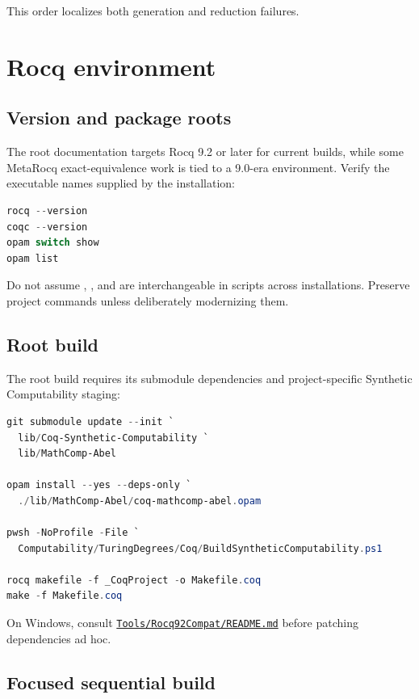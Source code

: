 \documentclass[
  10pt,
  a4paper,
  twoside,
  open=any,
  parskip=half,
  headings=big
]{scrreprt}
\newcommand{\CommitFull}{675d0a2ff0fc624fba199e006049016ba806f40a}
\newcommand{\RepoBlobBase}{https://github.com/VladimirReshetnikov/ProveIt/blob/\CommitFull/}
\newcommand{\RepoFile}[1]{%
  \href{\RepoBlobBase\detokenize{#1}}{\nolinkurl{#1}}}
\newcommand{\code}[1]{\texttt{\detokenize{#1}}}
\begin{document}
This order localizes both generation and reduction failures.

\section{Rocq environment}

\subsection{Version and package roots}

The root documentation targets Rocq 9.2 or later for current builds, while
some MetaRocq exact-equivalence work is tied to a 9.0-era environment.  Verify
the executable names supplied by the installation:

\begin{lstlisting}[language=PowerShell]
rocq --version
coqc --version
opam switch show
opam list
\end{lstlisting}

Do not assume \code{coqc}, \code{rocq c}, and \code{rocq compile} are
interchangeable in scripts across installations.  Preserve project commands
unless deliberately modernizing them.

\subsection{Root build}

The root build requires its submodule dependencies and project-specific
Synthetic Computability staging:

\begin{lstlisting}[language=PowerShell]
git submodule update --init `
  lib/Coq-Synthetic-Computability `
  lib/MathComp-Abel

opam install --yes --deps-only `
  ./lib/MathComp-Abel/coq-mathcomp-abel.opam

pwsh -NoProfile -File `
  Computability/TuringDegrees/Coq/BuildSyntheticComputability.ps1

rocq makefile -f _CoqProject -o Makefile.coq
make -f Makefile.coq
\end{lstlisting}

On Windows, consult \RepoFile{Tools/Rocq92Compat/README.md} before patching
dependencies ad hoc.

\subsection{Focused sequential build}
\end{document}
